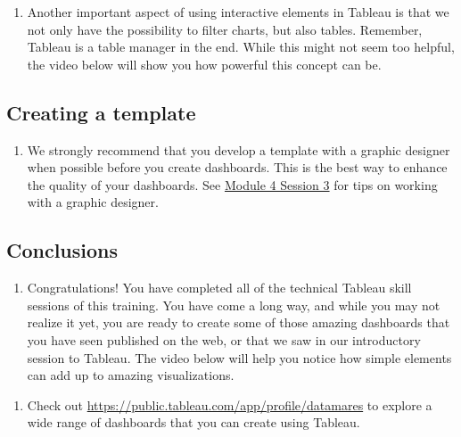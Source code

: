 \documentclass[
]{book}
\providecommand{\tightlist}{%
  \setlength{\itemsep}{0pt}\setlength{\parskip}{0pt}}
\begin{document}
\begin{enumerate}
\def\labelenumi{\arabic{enumi}.}
\tightlist
\item
  Another important aspect of using interactive elements in Tableau is that we not only have the possibility to filter charts, but also tables. Remember, Tableau is a table manager in the end. While this might not seem too helpful, the video below will show you how powerful this concept can be.
\end{enumerate}

\hypertarget{creating-a-template}{%
\subsection{Creating a template}\label{creating-a-template}}

\begin{enumerate}
\def\labelenumi{\arabic{enumi}.}
\tightlist
\item
  We strongly recommend that you develop a template with a graphic designer when possible before you create dashboards. This is the best way to enhance the quality of your dashboards. See \protect\hyperlink{working-with-graphic-designers}{Module 4 Session 3} for tips on working with a graphic designer.
\end{enumerate}

\hypertarget{conclusions-3}{%
\subsection{Conclusions}\label{conclusions-3}}

\begin{enumerate}
\def\labelenumi{\arabic{enumi}.}
\tightlist
\item
  Congratulations! You have completed all of the technical Tableau skill sessions of this training. You have come a long way, and while you may not realize it yet, you are ready to create some of those amazing dashboards that you have seen published on the web, or that we saw in our introductory session to Tableau. The video below will help you notice how simple elements can add up to amazing visualizations.
\end{enumerate}

\begin{enumerate}
\def\labelenumi{\arabic{enumi}.}
\setcounter{enumi}{1}
\tightlist
\item
  Check out \url{https://public.tableau.com/app/profile/datamares} to explore a wide range of dashboards that you can create using Tableau.
\end{enumerate}
\end{document}
